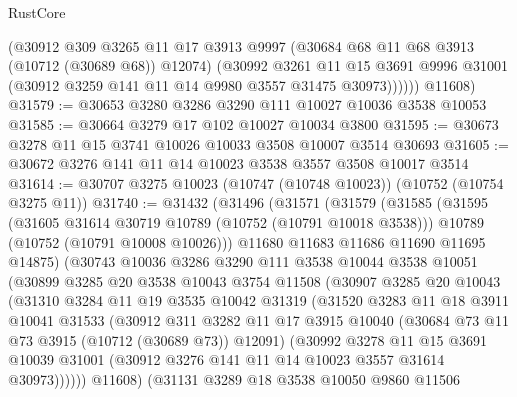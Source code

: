 \begin{lexlean}{RustCore}
\begin{coremodule}
            (@30912
              @309
              @3265
              @11
              @17
              @3913
              @9997
              (@30684 @68 @11 @68 @3913 (@10712 (@30689 @68)) @12074)
              (@30992
                @3261
                @11
                @15
                @3691
                @9996
                @31001
                (@30912 @3259 @141 @11 @14 @9980 @3557 @31475 @30973))))))
      @11608)
@31579 := @30653 @3280 @3286 @3290 @111 @10027 @10036 @3538 @10053
@31585 := @30664 @3279 @17 @102 @10027 @10034 @3800
@31595 := @30673 @3278 @11 @15 @3741 @10026 @10033 @3508 @10007 @3514 @30693
@31605 := @30672 @3276 @141 @11 @14 @10023 @3538 @3557 @3508 @10017 @3514
@31614 := @30707 @3275 @10023 (@10747 (@10748 @10023)) (@10752 (@10754 @3275 @11))
@31740 := @31432
    (@31496
      (@31571
        (@31579
          (@31585
            (@31595
              (@31605 @31614 @30719 @10789 (@10752 (@10791 @10018 @3538)))
              @10789
              (@10752 (@10791 @10008 @10026)))
            @11680
            @11683
            @11686
            @11690
            @11695
            @14875)
          (@30743
            @10036
            @3286
            @3290
            @111
            @3538
            @10044
            @3538
            @10051
            (@30899
              @3285
              @20
              @3538
              @10043
              @3754
              @11508
              (@30907
                @3285
                @20
                @10043
                (@31310
                  @3284
                  @11
                  @19
                  @3535
                  @10042
                  @31319
                  (@31520
                    @3283
                    @11
                    @18
                    @3911
                    @10041
                    @31533
                    (@30912
                      @311
                      @3282
                      @11
                      @17
                      @3915
                      @10040
                      (@30684 @73 @11 @73 @3915 (@10712 (@30689 @73)) @12091)
                      (@30992
                        @3278
                        @11
                        @15
                        @3691
                        @10039
                        @31001
                        (@30912 @3276 @141 @11 @14 @10023 @3557 @31614 @30973))))))
              @11608)
            (@31131
              @3289
              @18
              @3538
              @10050
              @9860
              @11506

\end{coremodule}
\end{lexlean}
